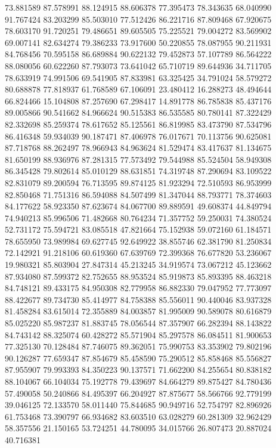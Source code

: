 73.881589
87.578991
88.124915
88.606378
77.395473
78.343635
68.040990
91.767424
83.203299
85.503010
77.512426
86.221716
87.809468
67.920675
78.603170
91.720251
79.486651
89.605505
75.225521
79.004272
83.569902
69.007141
82.634274
79.386233
73.917600
50.220855
78.087955
90.211931
84.768456
70.595158
86.689884
90.622132
79.452873
57.107789
86.564222
88.080056
60.622260
87.793073
73.641042
65.710719
89.644936
34.711705
78.633919
74.991506
69.541905
87.833981
63.325425
34.791024
58.579272
80.688878
77.818937
61.768589
67.106091
23.480412
16.288273
48.494644
66.824466
15.104808
87.257690
67.298417
14.891778
86.785838
85.437176
89.005866
90.541662
84.966624
90.515383
86.535585
80.780141
87.322429
82.332698
85.259374
78.617652
85.125561
86.819985
83.473790
87.534796
86.416348
59.934039
90.187471
87.406978
76.017671
70.113756
90.625081
87.718768
88.262497
78.966943
84.963624
81.529474
83.417637
81.134675
81.650199
88.936976
87.281315
77.573492
79.544988
85.524504
58.949308
86.345428
79.802614
85.010129
88.631851
74.319748
87.290694
83.109522
82.831079
89.200594
76.713595
89.874125
81.923294
72.510593
86.953999
82.850468
71.751316
86.594088
84.507499
81.347044
88.793771
78.374603
84.177622
58.923350
87.623674
84.067700
89.889591
49.608374
44.849794
74.940213
85.996506
71.482668
80.764234
71.357752
59.250031
74.380524
52.731172
75.594721
83.085518
47.821664
75.152938
59.072160
61.184571
78.655950
73.989984
69.627745
92.649922
38.855746
62.381790
81.250834
72.142921
91.218106
60.619360
67.639769
72.399368
76.677820
53.236067
19.980321
85.803904
27.847314
45.213245
34.919574
73.067212
45.123662
87.934080
87.599372
82.752655
88.953524
85.919873
85.893395
88.463218
84.748121
89.433175
84.950308
82.779958
86.882330
79.047952
77.773097
88.422677
89.734730
85.414977
84.758388
85.556011
90.440046
83.937328
81.458284
83.615014
72.355889
84.003857
81.995009
90.589078
80.616879
85.025220
85.987237
81.883745
78.056544
87.357907
66.282394
88.143822
84.743142
88.325074
60.428272
85.571904
85.297578
86.084511
81.900653
77.325130
70.128484
87.746075
89.362051
75.990753
83.353902
79.802196
90.126287
77.659347
87.854679
85.458590
75.290512
85.858468
85.556827
87.955907
79.993393
84.350223
90.137571
71.662200
84.255654
80.838182
88.104067
66.104034
75.192778
79.439697
84.664279
89.875427
84.780436
57.490058
50.240866
84.495397
66.204927
87.875677
58.566766
92.779199
39.046125
72.133570
58.011440
75.844685
90.949716
52.754797
82.896926
61.753468
73.390797
66.934682
83.603510
63.028279
60.281309
32.962429
58.357556
21.150165
53.724251
44.780095
34.015766
26.807473
20.887024
40.716381
